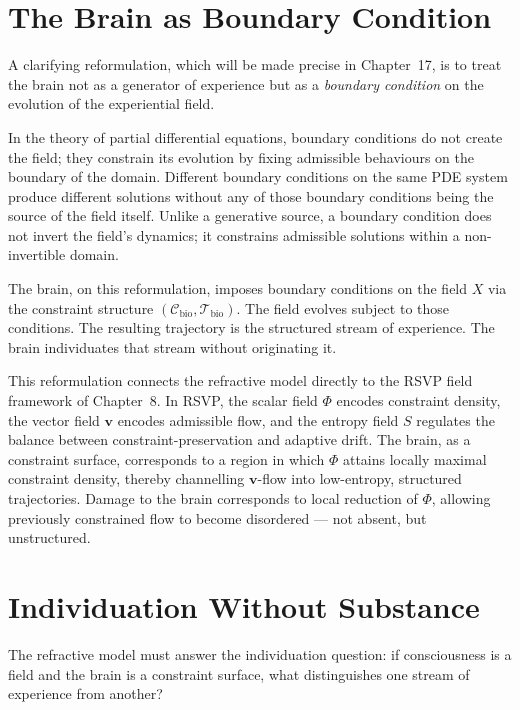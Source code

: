 \documentclass[11pt,openany]{book}
\begin{document}
\section{The Brain as Boundary Condition}
\label{sec:boundary-condition}

A clarifying reformulation, which will be made precise in
Chapter~17, is to treat the brain not as a generator of
experience but as a \emph{boundary condition} on the
evolution of the experiential field.

In the theory of partial differential equations, boundary
conditions do not create the field; they constrain its
evolution by fixing admissible behaviours on the boundary
of the domain.  Different boundary conditions on the same
PDE system produce different solutions without any of those
boundary conditions being the source of the field itself.
Unlike a generative source, a boundary condition does not
invert the field's dynamics; it constrains admissible
solutions within a non-invertible domain.

The brain, on this reformulation, imposes boundary
conditions on the field $X$ via the constraint structure
$(\mathcal{C}_{\mathrm{bio}}, \mathcal{T}_{\mathrm{bio}})$.
The field evolves subject to those conditions.  The
resulting trajectory is the structured stream of experience.
The brain individuates that stream without originating it.

This reformulation connects the refractive model directly
to the RSVP field framework of Chapter~8.  In RSVP, the
scalar field $\Phi$ encodes constraint density, the vector
field $\boldsymbol{v}$ encodes admissible flow, and the
entropy field $S$ regulates the balance between
constraint-preservation and adaptive drift.  The brain, as
a constraint surface, corresponds to a region in which
$\Phi$ attains locally maximal constraint density, thereby
channelling $\boldsymbol{v}$-flow into low-entropy,
structured trajectories.  Damage to the brain corresponds
to local reduction of $\Phi$, allowing previously
constrained flow to become disordered --- not absent, but
unstructured.

\section{Individuation Without Substance}
\label{sec:individuation}

The refractive model must answer the individuation
question: if consciousness is a field and the brain is a
constraint surface, what distinguishes one stream of
experience from another?
\end{document}
